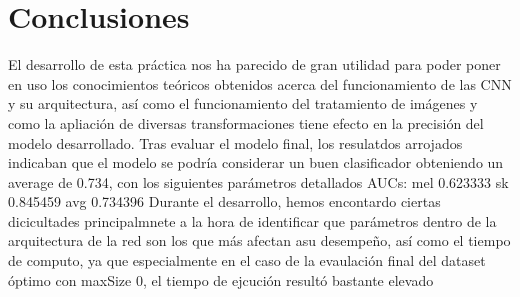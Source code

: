 \section{Conclusiones}

El desarrollo de esta práctica nos ha parecido de gran utilidad para poder poner en uso los conocimientos teóricos obtenidos acerca del funcionamiento de las CNN y su arquitectura, 
así como el funcionamiento del tratamiento de imágenes y como la apliación de diversas transformaciones tiene efecto en la precisión del modelo desarrollado.
Tras evaluar el modelo final, los resulatdos arrojados indicaban que el modelo se podría considerar un buen clasificador obteniendo un average de 0.734, con los siguientes parámetros detallados AUCs: mel 0.623333 sk 0.845459 avg 0.734396 
Durante el desarrollo, hemos encontardo ciertas dicicultades principalmnete a la hora de identificar que parámetros dentro de la arquitectura de la red son los que más afectan asu desempeño,
así como el tiempo de computo, ya que especialmente en el caso de la evaulación final del dataset óptimo con maxSize 0, el tiempo de ejcución resultó bastante elevado